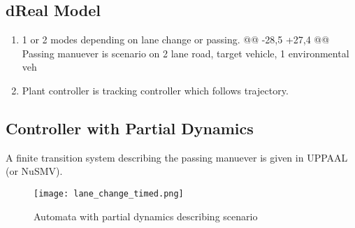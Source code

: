 \subsection{dReal Model}
\begin{enumerate}
	\item 1 or 2 modes depending on lane change or passing.
	@@ -28,5 +27,4 @@ Passing manuever is scenario on 2 lane road, target vehicle, 1 environmental veh
	\item Plant controller is tracking controller which follows trajectory.
\end{enumerate}
\subsection{Controller with Partial Dynamics}
A finite transition system describing the passing manuever is given in UPPAAL (or NuSMV).
\begin{figure}[tb]
	\label{fig:discreteview}
	\centering
	\texttt{[image: lane\_change\_timed.png]}
	\caption{Automata with partial dynamics describing scenario}
\end{figure}